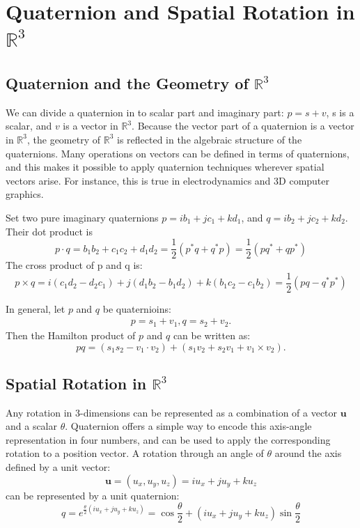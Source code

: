\documentclass{article}
\begin{document}
\section{Quaternion and Spatial Rotation in $\mathbb{R}^3$}

\subsection{Quaternion and the Geometry of $\mathbb{R}^3$}

We can divide a quaternion in to scalar part and imaginary part: $p = s+v$, s is a scalar, and $v$ is a vector in $\mathbb{R}^3$. Because the vector part of a quaternion is a vector in $\mathbb{R}^3$, the geometry of $\mathbb{R}^3$ is reflected in the algebraic structure of the quaternions. Many operations on vectors can be defined in terms of quaternions, and this makes it possible to apply quaternion techniques wherever spatial vectors arise. For instance, this is true in electrodynamics and 3D computer graphics.

Set two pure imaginary quaternions $p = ib_1+jc_1+kd_1$, and $q = ib_2+jc_2+kd_2$. Their dot product is
\begin{displaymath}
  p \cdot q = b_1b_2+c_1c_2+d_1d_2
  = \frac{1}{2}(p^*q+q^*p) = \frac{1}{2}(pq^*+qp^*)
\end{displaymath}
The cross product of p and q is:
\begin{displaymath}
  p \times q = i(c_1d_2-d_2c_1)+j(d_1b_2-b_1d_2)+k(b_1c_2-c_1b_2)
  =\frac{1}{2}(pq-q^*p^*)
\end{displaymath}

In general, let $p$ and $q$ be quaternioins:
\begin{displaymath}
  \begin{split}
    p = s_1+v_1,
    q = s_2+v_2.
  \end{split}
\end{displaymath}
Then the Hamilton product of $p$ and $q$ can be written as:
\begin{displaymath}
  pq = (s_1s_2-v_1 \cdot v_2)+(s_1v_2+s_2v_1+v_1 \times v_2).
\end{displaymath}

\subsection{Spatial Rotation in $\mathbb{R}^3$}
Any rotation in 3-dimensions can be represented as a combination of a vector $\mathbf{u}$ and a scalar $\theta$. Quaternion offers a simple way to encode this axis-angle representation in four numbers, and can be used to apply the corresponding rotation to a position vector. A rotation through an angle of $\theta$ around the axis defined by a unit vector:
\begin{displaymath}
  \mathbf{u} = (u_x, u_y, u_z) = iu_x + ju_y + ku_z
\end{displaymath}
can be represented by a unit quaternion:
\begin{equation}
  q = e^{\frac{\theta}{2}(iu_x+ju_y+ku_z)} = \cos{\frac{\theta}{2}}+(iu_x+ju_y+ku_z)\sin{\frac{\theta}{2}}
\end{equation}
\end{document}
